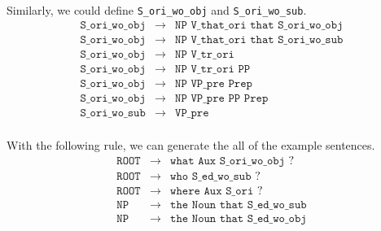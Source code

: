 \documentclass[11pt]{article}
\newcommand{\code}[1]{\texttt{#1}}
\begin{document}
\begin{enumerate}
Similarly, we could define \code{S\_ori\_wo\_obj} and \code{S\_ori\_wo\_sub}.
\begin{eqnarray*}
\code{S\_ori\_wo\_obj} &\to&  \code{NP V\_that\_ori that S\_ori\_wo\_obj}\\
\code{S\_ori\_wo\_obj} &\to&  \code{NP V\_that\_ori that S\_ori\_wo\_sub}\\
\code{S\_ori\_wo\_obj} &\to&  \code{NP V\_tr\_ori}\\
\code{S\_ori\_wo\_obj} &\to&  \code{NP V\_tr\_ori PP}\\
\code{S\_ori\_wo\_obj} &\to&  \code{NP VP\_pre Prep}\\
\code{S\_ori\_wo\_obj} &\to&  \code{NP VP\_pre PP Prep}\\
\code{S\_ori\_wo\_sub} &\to&  \code{VP\_pre}\\
\end{eqnarray*}

With the following rule, we can generate the all of the example sentences.
\begin{eqnarray*}
\code{ROOT} &\to&  \code{what Aux S\_ori\_wo\_obj ?}\\
\code{ROOT} &\to&  \code{who S\_ed\_wo\_sub ?}\\
\code{ROOT} &\to&  \code{where Aux S\_ori ?}\\
\code{NP}   &\to&  \code{the Noun that S\_ed\_wo\_sub}\\
\code{NP}   &\to&  \code{the Noun that S\_ed\_wo\_obj}\\
\end{eqnarray*}

\end{enumerate}
\end{document}
